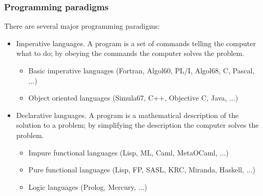 \documentclass{beamer}
\begin{document}
\begin{frame}
\frametitle{Programming paradigms}

There are several major programming paradigms:

\begin{itemize}
\item {\bluetext Imperative languages.}  A program is a set of
  commands telling the computer what to do; by obeying the commands
  the computer solves the problem.
  \begin{itemize}
  \item {\bluetext Basic imperative languages} {\redtext (Fortran,
      Algol60, PL/I, Algol68, C, Pascal, $\ldots$)}
  \item {\bluetext Object oriented languages} {\redtext (Simula67,
      C++, Objective C, Java, $\ldots$)}
  \end{itemize}
\item {\bluetext Declarative languages.}  A program is a
  mathematical description of the solution to a problem; by
  simplifying the description the computer solves the problem.
  \begin{itemize}
  \item {\bluetext Impure functional languages} {\redtext (Lisp,
      ML, Caml, MetaOCaml, $\dots$)}
  \item {\bluetext Pure functional languages} {\redtext (Lisp, FP,
      SASL, KRC, Miranda, Haskell, $\dots$)}
  \item {\bluetext Logic languages} {\redtext (Prolog, Mercury,
      $\ldots$)}
  \end{itemize}
\end{itemize}

\end{frame}
\end{document}
